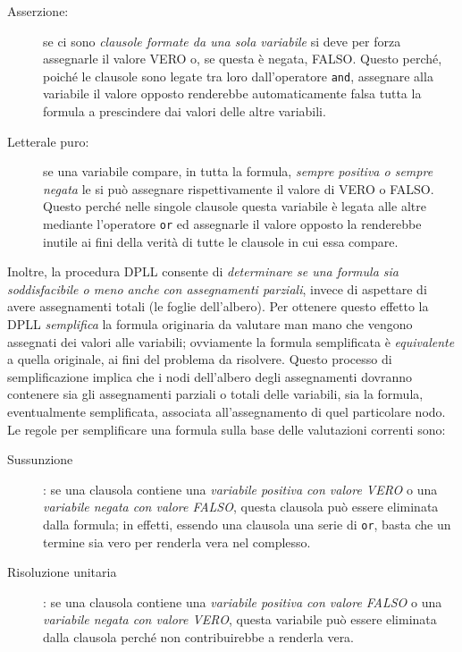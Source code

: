 \documentclass[12pt, a4paper, twosides]{report}
\begin{document}
\begin{description}
\item[Asserzione:] se ci sono \textit{clausole formate da una sola variabile} si deve per forza assegnarle il valore VERO o, se questa è negata, FALSO. Questo perché, poiché le clausole sono legate tra loro dall'operatore \verb|and|, assegnare alla variabile il valore opposto renderebbe automaticamente falsa tutta la formula a prescindere dai valori delle altre variabili.

\item[Letterale puro:] se una variabile compare, in tutta la formula, \textit{sempre positiva o sempre negata} le si può assegnare rispettivamente il valore di VERO o FALSO. Questo perché nelle singole clausole questa variabile è legata alle altre mediante l'operatore \verb|or| ed assegnarle il valore opposto la renderebbe inutile ai fini della verità di tutte le clausole in cui essa compare.
\end{description}

Inoltre, la procedura DPLL consente di \textit{determinare se una formula sia soddisfacibile o meno anche con assegnamenti parziali}, invece di aspettare di avere assegnamenti totali (le foglie dell'albero). Per ottenere questo effetto la DPLL \textit{semplifica} la formula originaria da valutare man mano che vengono assegnati dei valori alle variabili;  ovviamente la formula semplificata è \textit{equivalente} a quella originale, ai fini del problema da risolvere. Questo processo di semplificazione implica che i nodi dell'albero degli assegnamenti dovranno contenere sia gli assegnamenti parziali o totali delle variabili, sia la formula, eventualmente semplificata, associata all'assegnamento di quel particolare nodo. Le regole per semplificare una formula sulla base delle valutazioni correnti sono:

\begin{description}
\item[Sussunzione]: se una clausola contiene una \textit{variabile positiva con valore VERO} o una \textit{variabile negata con valore FALSO}, questa clausola può essere eliminata dalla formula; in effetti, essendo una clausola una serie di \verb|or|, basta che un termine sia vero per renderla vera nel complesso.

\item[Risoluzione unitaria]: se una clausola contiene una \textit{variabile positiva con valore FALSO} o una \textit{variabile negata con valore VERO}, questa variabile può essere eliminata dalla clausola perché non contribuirebbe a renderla vera.
\end{description}
\end{document}
